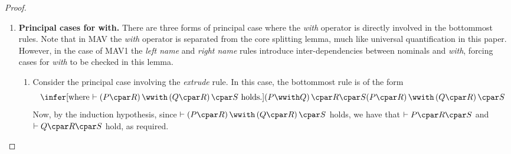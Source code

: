 \begin{proof}
\begin{enumerate}[label=\textbf{\Alph*},ref=\Alph*,leftmargin=*]
\[{{{{{{{\tcontextmn{0}{i}{P^{i,0}_j \cpar Q^{i,0}_j \colon 1 \leq j \leq m^0_i}
  \cpar
  P^{i,1}_k \cpar Q^{i,1}_k \colon 1 \leq k \leq m^1_i
} \colon 1 \leq i \leq n }
}{
 \tcontext{ \tcontextmn{1}{i}{
\tcontextmn{0}{i}{
P^{i,0}_j \cpar P^{i,1}_k \cpar Q^{i,0}_j \cpar Q^{i,1}_k
  \colon 1 \leq j \leq m^0_i
}
 \colon 1 \leq k \leq m^1_i
} \colon 1 \leq i \leq n }
}}}}}
\]
Now observe that the following two proofs can be constructed.
\[
\infer[]{
\left(T_0 \tensor T_1\right)
\cpar
P^{i,0}_j \cpar P^{i,1}_k
}{
\infer[]{
\left(T_0 \cpar P^{i,0}_j\right) \tensor \left(T_1 \cpar P^{i,1}_k\right)
}{
\cunit
}}
\qquad\qquad\qquad\qquad
\infer[]{
\left(U_0 \tensor U_1\right)
\cpar
Q^{i,0}_j \cpar Q^{i,1}_k
}{
\infer[]{
\left(U_0 \cpar Q^{i,0}_j\right) \tensor \left(U_1 \cpar Q^{i,1}_k\right)
}{
 \cunit
}}
\]
Furthermore,
$\occ{ T_0 \tensor T_1 } \mstrict \occ{ T_0 \tensor T_1 \tensor U_0 \tensor U_1 }$
and 
$\occ{ U_0 \tensor U_1 } \mstrict \occ{ T_0 \tensor T_1 \tensor U_0 \tensor U_1 }$,
since $T_0 \tensor T_1 \not\equiv \cunit$ and $U_0 \tensor U_1 \not\equiv \cunit$.
Also, by Lemma~\ref{lemma:bound}, the following inequality holds.
\[
\size{
 \tcontext{ \tcontextmn{1}{i}{
\tcontextmn{0}{i}{
P^{i,0}_j \cpar P^{i,1}_k \cpar Q^{i,0}_j \cpar Q^{i,1}_k
  \colon 1 \leq j \leq m^0_i
}
 \colon 1 \leq k \leq m^1_i
} \colon 1 \leq i \leq n }
} \preceq \size{ V \cpar W }
\]
Hence both
$
\size{ P^{i,0}_j \cpar P^{i,1}_k }
\preceq \size{ V \cpar W }$
and $
\size{ Q^{i,0}_j \cpar Q^{i,1}_k }
\preceq \size{ V \cpar W }$ hold.
Thereby the size of each of the above proofs is strictly bounded above by the size of the proof of $\left(T_0 \tensor T_1 \tensor U_0 \tensor U_1 \right) \cpar V \cpar W$.




\item \textbf{Principal cases for with.}
There are three forms of principal case where the \textit{with} operator is directly involved in the bottommost rules.
Note that in \textsf{MAV} the \textit{with} operator is separated from the core splitting lemma, much like universal quantification in this paper.
However, in the case of \textsf{MAV1} the \textit{left name} and \textit{right name} rules introduce inter-dependencies between nominals and \textit{with}, forcing cases for \textit{with} to be checked in this lemma.

\begin{enumerate}[label*=\textbf{.\arabic*}]

\item Consider the principal case involving the \textit{extrude} rule.
In this case, the bottommost rule is of the form 
\[
\infer[\mbox{where $\vdash \left(P  \cpar R\right)\wwith\left( Q \cpar R\right) \cpar S$ holds.}]{
\left(P \wwith Q\right) \cpar R \cpar S
}{
\left(P  \cpar R\right)\wwith\left( Q \cpar R\right) \cpar S
}
\]
Now, by the induction hypothesis, 
since $\vdash \left(P  \cpar R\right)\wwith\left( Q \cpar R\right) \cpar S$ holds, we have that 
$\vdash P  \cpar R \cpar S$ and $\vdash Q \cpar R \cpar S$ hold, as required.




\end{enumerate}
\end{enumerate}
\end{proof}
